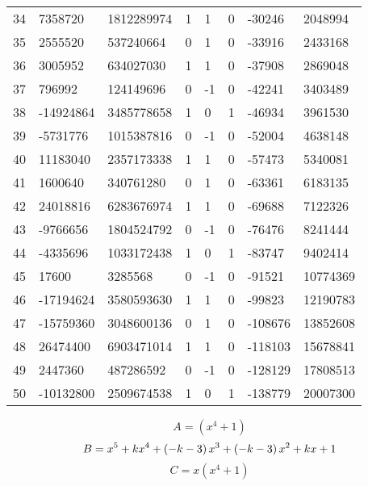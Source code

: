 \documentclass{amsart}
\begin{document}
\begin{longtable}{|l|l|l|lllll|}
34&7358720&1812289974&1&1&0&-30246&2048994\\
35&2555520&537240664&0&1&0&-33916&2433168\\
36&3005952&634027030&1&1&0&-37908&2869048\\
37&796992&124149696&0&-1&0&-42241&3403489\\
38&-14924864&3485778658&1&0&1&-46934&3961530\\
39&-5731776&1015387816&0&-1&0&-52004&4638148\\
40&11183040&2357173338&1&1&0&-57473&5340081\\
41&1600640&340761280&0&1&0&-63361&6183135\\
42&24018816&6283676974&1&1&0&-69688&7122326\\
43&-9766656&1804524792&0&-1&0&-76476&8241444\\
44&-4335696&1033172438&1&0&1&-83747&9402414\\
45&17600&3285568&0&-1&0&-91521&10774369\\
46&-17194624&3580593630&1&1&0&-99823&12190783\\
47&-15759360&3048600136&0&1&0&-108676&13852608\\
48&26474400&6903471014&1&1&0&-118103&15678841\\
49&2447360&487286592&0&-1&0&-128129&17808513\\
50&-10132800&2509674538&1&0&1&-138779&20007300\\
\hline
\end{longtable}
$$A=(x^4
 + 1)$$
$$B=x^5
 + k\*x^4
 + \left(-k
 - 3\right) \*x^3
 + \left(-k
 - 3\right) \*x^2
 + k\*x
 + 1$$
$$C=x(x^4
 + 1)$$
\end{document}
